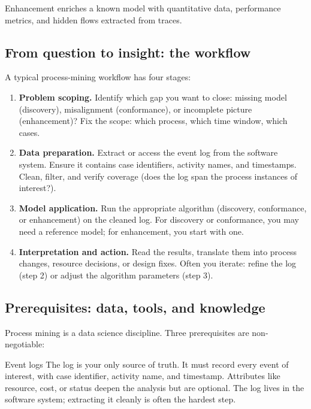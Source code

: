 Enhancement enriches a known model with quantitative data, performance metrics, and hidden flows extracted from traces.

\subsection{From question to insight: the workflow}

A typical process-mining workflow has four stages:

\begin{enumerate}
\item \textbf{Problem scoping.} Identify which gap you want to close: missing model (discovery), misalignment (conformance), or incomplete picture (enhancement)? Fix the scope: which process, which time window, which cases.

\item \textbf{Data preparation.} Extract or access the event log from the software system. Ensure it contains case identifiers, activity names, and timestamps. Clean, filter, and verify coverage (does the log span the process instances of interest?).

\item \textbf{Model application.} Run the appropriate algorithm (discovery, conformance, or enhancement) on the cleaned log. For discovery or conformance, you may need a reference model; for enhancement, you start with one.

\item \textbf{Interpretation and action.} Read the results, translate them into process changes, resource decisions, or design fixes. Often you iterate: refine the log (step 2) or adjust the algorithm parameters (step 3).
\end{enumerate}

\subsection{Prerequisites: data, tools, and knowledge}

Process mining is a data science discipline. Three prerequisites are non-negotiable:

\begin{definitionbox}{Event logs}
The log is your only source of truth. It must record every event of interest, with case identifier, activity name, and timestamp. Attributes like resource, cost, or status deepen the analysis but are optional. The log lives in the software system; extracting it cleanly is often the hardest step.
\end{definitionbox}

